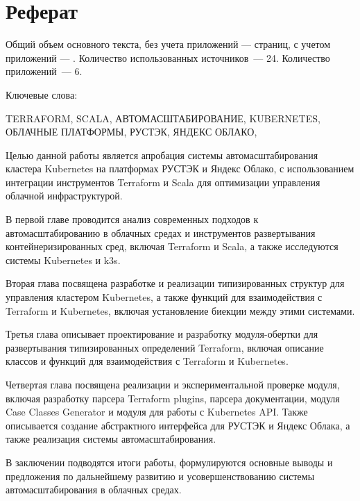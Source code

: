 \chapter*{Реферат}
\thispagestyle{plain}

Общий объем основного текста, без учета приложений ---
\pageref{end_of_main_text} страниц, с учетом приложений ---
\pageref{end_of_document}. Количество использованных источников~--- 24.
Количество приложений~--- 6.

Ключевые слова:

\noindent \uppercase{
terraform,
scala,
автомасштабирование,
kubernetes,
облачные платформы,
РУСТЭК,
Яндекс Облако,
}

Целью данной работы является апробация системы автомасштабирования кластера
Kubernetes на платформах РУСТЭК и Яндекс Облако, с использованием интеграции
инструментов Terraform и Scala для оптимизации управления облачной
инфраструктурой.

В первой главе проводится анализ современных подходов к автомасштабированию в
облачных средах и инструментов развертывания контейнеризированных сред, включая
Terraform и Scala, а также исследуются системы Kubernetes и k3s.

Вторая глава посвящена разработке и реализации типизированных структур для
управления кластером Kubernetes, а также функций для взаимодействия с Terraform
и Kubernetes, включая установление биекции между этими системами.

Третья глава описывает проектирование и разработку модуля-обертки для
развертывания типизированных определений Terraform, включая описание классов и
функций для взаимодействия с Terraform и Kubernetes.

Четвертая глава посвящена реализации и экспериментальной проверке модуля,
включая разработку парсера Terraform plugins, парсера документации, модуля Case
Classes Generator и модуля для работы с Kubernetes API. Также описывается
создание абстрактного интерфейса для РУСТЭК и Яндекс Облака, а также реализация
системы автомасштабирования.

В заключении подводятся итоги работы, формулируются основные выводы и
предложения по дальнейшему развитию и усовершенствованию системы
автомасштабирования в облачных средах.


